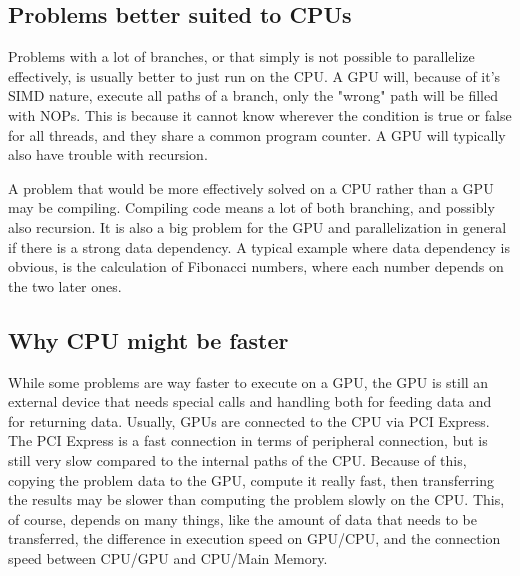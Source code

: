 \documentclass[english,a4paper,numbers=noenddot]{article}
\begin{document}
\subsection{Problems better suited to CPUs}
Problems with a lot of branches, or that simply is not possible to parallelize effectively, is usually better to just run on the CPU. A GPU will, because of it's SIMD nature, execute all paths of a branch, only the "wrong" path will be filled with NOPs. This is because it cannot know wherever the condition is true or false for all threads, and they share a common program counter. A GPU will typically also have trouble with recursion. 

A problem that would be more effectively solved on a CPU rather than a GPU may be compiling. Compiling code means a lot of both branching, and possibly also recursion. It is also a big problem for the GPU and parallelization in general if there is a strong data dependency. A typical example where data dependency is obvious, is the calculation of Fibonacci numbers, where each number depends on the two later ones.

\subsection{Why CPU might be faster}
While some problems are way faster to execute on a GPU, the GPU is still an external device that needs special calls and handling both for feeding data and for returning data. Usually, GPUs are connected to the CPU via PCI Express. The PCI Express is a fast connection in terms of peripheral connection, but is still very slow compared to the internal paths of the CPU. Because of this, copying the problem data to the GPU, compute it really fast, then transferring the results may be slower than computing the problem slowly on the CPU. This, of course, depends on many things, like the amount of data that needs to be transferred, the difference in execution speed on GPU/CPU, and the connection speed between CPU/GPU and CPU/Main Memory.
\end{document}
